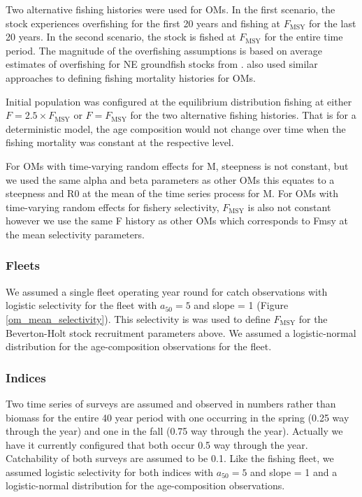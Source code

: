 \documentclass[
  12pt,
]{article}
\newcommand{\Fmsy}{\ensuremath{F_{\text{MSY}}}\xspace}
\begin{document}
Two alternative fishing histories were used for OMs. In the first
scenario, the stock experiences overfishing for the first 20 years and
fishing at \Fmsy for the last 20 years. In the second scenario, the
stock is fished at \Fmsy for the entire time period. The magnitude of
the overfishing assumptions is based on average estimates of overfishing
for NE groundfish stocks from \citet{wiedenmannetal19}.
 also used similar approaches to defining fishing
mortality histories for OMs.

Initial population was configured at the equilibrium distribution
fishing at either \(F = 2.5\times \Fmsy\) or \(F = \Fmsy\) for the two
alternative fishing histories. That is for a deterministic model, the
age composition would not change over time when the fishing mortality
was constant at the respective level.

For OMs with time-varying random effects for M, steepness is not
constant, but we used the same alpha and beta parameters as other OMs
this equates to a steepness and R0 at the mean of the time series
process for M. For OMs with time-varying random effects for fishery
selectivity, \Fmsy is also not constant however we use the same F
history as other OMs which corresponds to Fmsy at the mean selectivity
parameters.

\hypertarget{fleets}{%
\subsubsection*{Fleets}\label{fleets}}

We assumed a single fleet operating year round for catch observations
with logistic selectivity for the fleet with \(a_{50} = 5\) and slope =
1 (Figure \ref{om_mean_selectivity}). This selectivity is was used to
define \Fmsy for the Beverton-Holt stock recruitment parameters above.
We assumed a logistic-normal distribution for the age-composition
observations for the fleet.

\hypertarget{indices}{%
\subsubsection*{Indices}\label{indices}}

Two time series of surveys are assumed and observed in numbers rather
than biomass for the entire 40 year period with one occurring in the
spring (0.25 way through the year) and one in the fall (0.75 way through
the year). Actually we have it currently configured that both occur 0.5
way through the year. Catchability of both surveys are assumed to be
0.1. Like the fishing fleet, we assumed logistic selectivity for both
indices with \(a_{50} = 5\) and slope = 1 and a logistic-normal
distribution for the age-composition observations.
\end{document}
